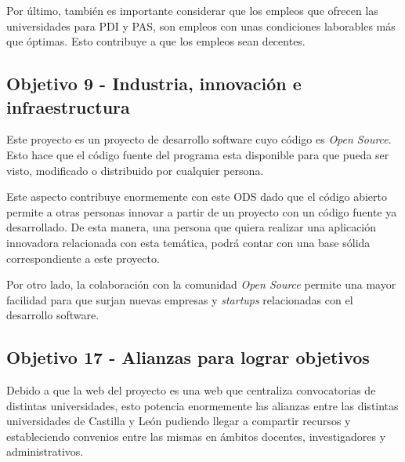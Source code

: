 Por último, también es importante considerar que los empleos que ofrecen las universidades para PDI y PAS, son empleos con unas condiciones laborables más que óptimas. Esto contribuye a que los empleos sean decentes.

\subsection{Objetivo 9 - Industria, innovación e infraestructura}
Este proyecto es un proyecto de desarrollo software cuyo código es \textit{Open Source}. Esto hace que el código fuente del programa esta disponible para que pueda ser visto, modificado o distribuido por cualquier persona.

Este aspecto contribuye enormemente con este ODS dado que el código abierto permite a otras personas innovar a partir de un proyecto con un código fuente ya desarrollado. De esta manera, una persona que quiera realizar una aplicación innovadora relacionada con esta temática, podrá contar con una base sólida correspondiente a este proyecto.

Por otro lado, la colaboración con la comunidad \textit{Open Source} permite una mayor facilidad para que surjan nuevas empresas y \textit{startups} relacionadas con el desarrollo software.


\subsection{Objetivo 17 - Alianzas para lograr objetivos}
Debido a que la web del proyecto es una web que centraliza convocatorias de distintas universidades, esto potencia enormemente las alianzas entre las distintas universidades de Castilla y León pudiendo llegar a compartir recursos y estableciendo convenios entre las mismas en ámbitos docentes, investigadores y administrativos.

